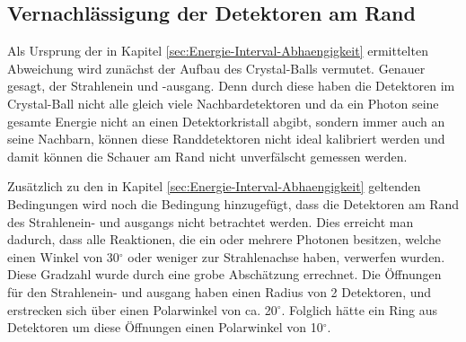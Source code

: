 \documentclass[a4paper,11pt,oneside,final,german,openbib,pdftex]{scrbook}
\begin{document}
{\subsection{Vernachl\"assigung der Detektoren am Rand}
\label{sec:Vernachlaessigung-der-Detektoren-am-Rand}

Als Ursprung der in Kapitel \ref{sec:Energie-Interval-Abhaengigkeit} ermittelten Abweichung wird zun\"achst der Aufbau des Crystal-Balls vermutet. Genauer gesagt, der Strahlenein und -ausgang. Denn durch diese haben die Detektoren im Crystal-Ball nicht alle gleich viele Nachbardetektoren und da ein Photon seine gesamte Energie nicht an einen Detektorkristall abgibt, sondern immer auch an seine Nachbarn, k\"onnen diese Randdetektoren nicht ideal kalibriert werden und damit k\"onnen die Schauer am Rand nicht unverf\"alscht gemessen werden. 





Zus\"atzlich zu den in Kapitel \ref{sec:Energie-Interval-Abhaengigkeit} geltenden Bedingungen wird noch die Bedingung hinzugef\"ugt, dass die Detektoren am Rand des Strahlenein- und ausgangs nicht betrachtet werden. Dies erreicht man dadurch, dass alle Reaktionen, die ein oder mehrere Photonen besitzen, welche einen Winkel von 30$^{\circ}$ oder weniger zur Strahlenachse haben, verwerfen wurden. Diese Gradzahl wurde durch eine grobe Absch\"atzung errechnet. Die \"Offnungen f\"ur den Strahlenein- und ausgang haben einen Radius von 2 Detektoren, und erstrecken sich \"uber einen Polarwinkel von ca. 20$^{\circ}$. Folglich h\"atte ein Ring aus Detektoren um diese \"Offnungen einen Polarwinkel von 10$^{\circ}$. 
 
}
\end{document}
